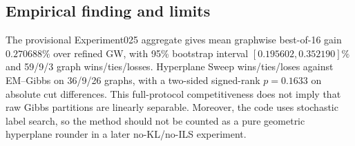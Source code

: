 \subsection{Empirical finding and limits}
The provisional Experiment025 aggregate gives mean graphwise best-of-16 gain $0.270688\%$ over refined GW, with 95\% bootstrap interval $[0.195602,0.352190]\%$ and 59/9/3 graph wins/ties/losses. Hyperplane Sweep wins/ties/loses against EM--Gibbs on 36/9/26 graphs, with a two-sided signed-rank $p=0.1633$ on absolute cut differences. This full-protocol competitiveness does not imply that raw Gibbs partitions are linearly separable. Moreover, the code uses stochastic label search, so the method should not be counted as a pure geometric hyperplane rounder in a later no-KL/no-ILS experiment.
